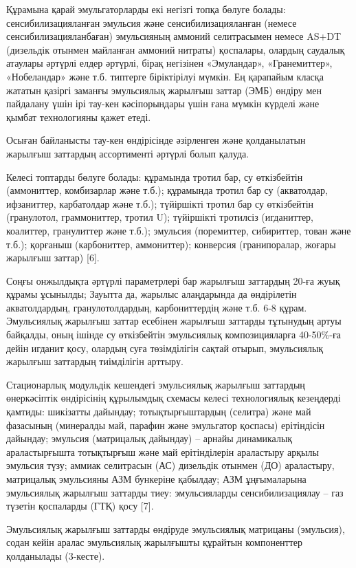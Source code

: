 \begin{multicols}{2}
Құрамына қарай эмульгаторларды екі негізгі топқа бөлуге болады:
сенсибилизацияланған эмульсия және сенсибилизацияланған (немесе
сенсибилизацияланбаған) эмульсияның аммоний селитрасымен немесе AS+DT
(дизельдік отынмен майланған аммоний нитраты) қоспалары, олардың
саудалық атаулары әртүрлі елдер әртүрлі, бірақ негізінен «Эмуландар»,
«Гранемиттер», «Нобеландар» және т.б. типтерге біріктірілуі мүмкін. Ең
қарапайым класқа жататын қазіргі заманғы эмульсиялық жарылғыш заттар
(ЭМБ) өндіру мен пайдалану үшін ірі тау-кен кәсіпорындары үшін ғана
мүмкін күрделі және қымбат технологияны қажет етеді.

Осыған байланысты тау-кен өндірісінде әзірленген және қолданылатын
жарылғыш заттардың ассортименті әртүрлі болып қалуда.

Келесі топтарды бөлуге болады: құрамында тротил бар, су өткізбейтін
(аммониттер, комбизарлар және т.б.); құрамында тротил бар су
(акватолдар, ифзаниттер, карбатолдар және т.б.); түйіршікті тротил бар
су өткізбейтін (гранулотол, граммониттер, тротил U); түйіршікті
тротилсіз (игданиттер, коалиттер, гранулиттер және т.б.); эмульсия
(поремиттер, сибириттер, тован және т.б.); қорғаныш (карбониттер,
аммониттер); конверсия (гранипоралар, жоғары жарылғыш заттар) {[}6{]}.

Соңғы онжылдықта әртүрлі параметрлері бар жарылғыш заттардың 20-ға жуық
құрамы ұсынылды; Зауытта да, жарылыс алаңдарында да өндірілетін
акватолдардың, гранулотолдардың, карбониттердің және т.б. 6-8 құрам.
Эмульсиялық жарылғыш заттар есебінен жарылғыш заттарды тұтынудың артуы
байқалды, оның ішінде су өткізбейтін эмульсиялық композицияларға
40-50\%-ға дейін игданит қосу, олардың суға төзімділігін сақтай отырып,
эмульсиялық жарылғыш заттардың тиімділігін арттыру.

Стационарлық модульдік кешендегі эмульсиялық жарылғыш заттардың
өнеркәсіптік өндірісінің құрылымдық схемасы келесі технологиялық
кезеңдерді қамтиды: шикізатты дайындау; тотықтырғыштардың (селитра) және
май фазасының (минералды май, парафин және эмульгатор қоспасы)
ерітіндісін дайындау; эмульсия (матрицалық дайындау) -- арнайы
динамикалық араластырғышта тотықтырғыш және май ерітінділерін араластыру
арқылы эмульсия түзу; аммиак селитрасын (АС) дизельдік отынмен (ДО)
араластыру, матрицалық эмульсияны АЗМ бункеріне қабылдау; АЗМ
ұңғымаларына эмульсиялық жарылғыш заттарды тиеу: эмульсияларды
сенсибилизациялау -- газ түзетін қоспаларды (ГТҚ) қосу {[}7{]}.

Эмульсиялық жарылғыш заттарды өндіруде эмульсиялық матрицаны (эмульсия),
содан кейін аралас эмульсиялық жарылғышты құрайтын компоненттер
қолданылады (3-кесте).
\end{multicols}

